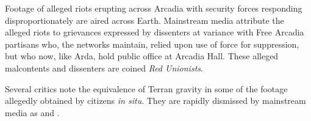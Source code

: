 Footage of alleged riots erupting across Arcadia with security forces responding disproportionately are aired across Earth. Mainstream media attribute the alleged riots to grievances expressed by dissenters at variance with Free Arcadia partisans who, the networks maintain, relied upon use of force for suppression, but who now, like Arda, hold public office at Arcadia Hall. These alleged malcontents and dissenters are coined {\it Red Unionists}. 

Several critics note the equivalence of Terran gravity in some of the footage allegedly obtained by citizens {\it in situ}. They are rapidly dismissed by mainstream media as  and .
\StopTimelineDate

